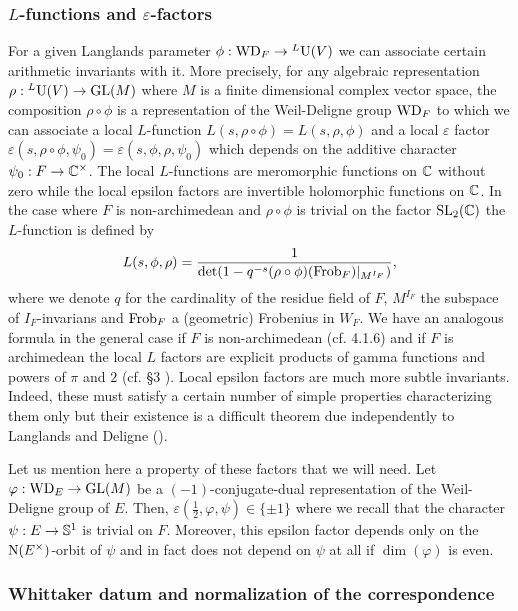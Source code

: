 \subsubsection{$L$-functions and $\varepsilon$-factors}

For a given Langlands parameter $\phi: \mathrm{WD}_F \to {}^L \mathrm{U}(V)$ we can associate certain arithmetic invariants with it.
More precisely, for any algebraic representation $\rho: {}^L \mathrm{U}(V) \to \mathrm{GL}(M)$ where $M$ is a finite dimensional complex vector space, the composition $\rho \circ \phi$ is a representation of the Weil-Deligne group $\mathrm{WD}_F$ to which we can associate a local $L$-function $L(s, \rho\circ \phi) = L(s, \rho, \phi)$ and a local $\varepsilon$ factor $\varepsilon(s, \rho\circ\phi, \psi_0) = \varepsilon(s, \phi, \rho, \psi_0)$ which depends on the additive character $\psi_0: F \to \mathbb{C}^\times$.
The local $L$-functions are meromorphic functions on $\mathbb{C}$ without zero while the local epsilon factors are invertible holomorphic functions on $\mathbb{C}$.
In the case where $F$ is non-archimedean and $\rho \circ \phi$ is trivial on the factor $\mathrm{SL}_2(\mathbb{C})$ the $L$-function is defined by
\[
    L(s, \phi, \rho) = \frac{1}{\det(1 - q^{-s} (\rho \circ \phi)(\mathrm{Frob}_F)|_{M^{I_F}})},
\]
where we denote $q$ for the cardinality of the residue field of $F$, $M^{I_F}$ the subspace of $I_F$-invarians and $\mathrm{Frob}_F$ a (geometric) Frobenius in $W_F$.
We have an analogous formula in the general case if $F$ is non-archimedean (cf. \cite{tate1979number} 4.1.6) and if $F$ is archimedean the local $L$ factors are explicit products of gamma functions and powers of $\pi$ and $2$ (cf. \cite{tate1979number} \S 3 ).
Local epsilon factors are much more subtle invariants.
Indeed, these must satisfy a certain number of simple properties characterizing them only but their existence is a difficult theorem due independently to Langlands and Deligne (\cite{deligne1973constantes}).

Let us mention here a property of these factors that we will need.
Let $\varphi: \mathrm{WD}_E \to \mathrm{GL}(M)$ be a $(-1)$-conjugate-dual representation of the Weil-Deligne group of $E$.
Then, $\varepsilon(\frac{1}{2}, \varphi, \psi) \in \{ \pm 1\}$ where we recall that the character $\psi: E \to \mathbb{S}^1$ is trivial on $F$.
Moreover, this epsilon factor depends only on the $\mathrm{N}(E^\times)$-orbit of $\psi$ and in fact does not depend on $\psi$ at all if $\dim(\varphi)$ is even.


\subsubsection{Whittaker datum and normalization of the correspondence}

